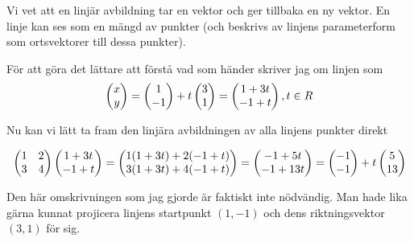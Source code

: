 \documentclass[../../main.tex]{subfiles}
\begin{document}
\begin{solution}{5} 
Vi vet att en linjär avbildning tar en vektor och ger tillbaka en ny vektor. En linje kan ses som en mängd av punkter (och beskrivs av linjens parameterform som ortsvektorer till dessa punkter).

För att göra det lättare att förstå vad som händer skriver jag om linjen som
$$
\begin{pmatrix}x\\y\end{pmatrix} =\begin{pmatrix}1\\-1\end{pmatrix} + t\begin{pmatrix}3\\1\end{pmatrix}=\begin{pmatrix}1+3t\\-1+t\end{pmatrix}, t\in R
$$

Nu kan vi lätt ta fram den linjära avbildningen av alla linjens punkter direkt

$$
\begin{pmatrix}
1&2\\
3&4
\end{pmatrix} \begin{pmatrix}1+3t\\-1+t\end{pmatrix} = \begin{pmatrix}1(1+3t) + 2(-1+t)\\3(1+3t) + 4(-1+t)\end{pmatrix} = \begin{pmatrix}-1+5t\\-1+13t\end{pmatrix} = \begin{pmatrix}-1\\-1\end{pmatrix} + t\begin{pmatrix}5\\13\end{pmatrix}
$$

Den här omskrivningen som jag gjorde är faktiskt inte nödvändig. Man hade lika gärna kunnat projicera linjens startpunkt $(1, -1)$ och dens riktningsvektor $(3,1)$ för sig.

\end{solution}
\end{document}
